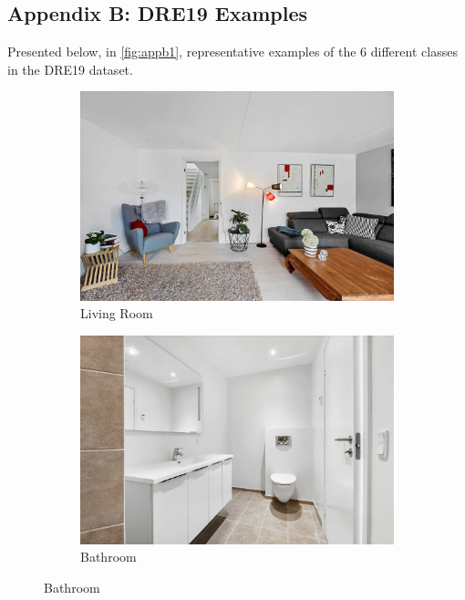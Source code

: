 \subsection*{Appendix B: DRE19 Examples}\label{appendix: B}
Presented below, in \autoref{fig:appb1}, representative examples of the 6 different classes in the DRE19 dataset.

\begin{figure}[H]
  \centering %
  \begin{subfigure}{0.3\textwidth}
    \includegraphics[width=\linewidth]{pictures/random/example_livingroom}
    \caption{Living Room}
  \end{subfigure}\hfil %
  \begin{subfigure}{0.3\textwidth}
    \includegraphics[width=\linewidth]{pictures/random/example_bathroom}
    \caption{Bathroom}
  \end{subfigure}\hfil %

\end{figure}
